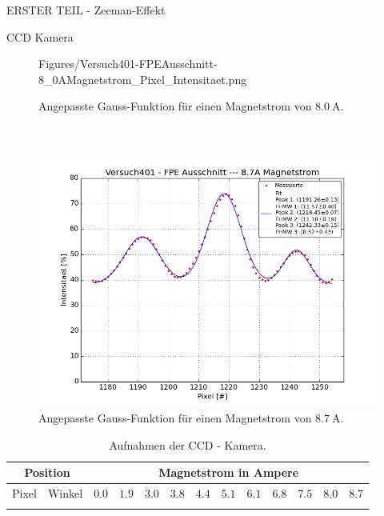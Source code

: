 \begin{appendix}
\begin{chapter}{ERSTER TEIL - Zeeman-Effekt}
\begin{section}{CCD Kamera}
\begin{figure}[htbp!]
\begin{minipage}{0.48\textwidth}
        {Figures/Versuch401-FPEAusschnitt-8_0AMagnetstrom_Pixel_Intensitaet.png}
          \caption{Angepasste Gauss-Funktion für einen Magnetstrom von 
              $\SI{8.0}{\ampere}$.}
          \label{fig:AnhangZM80}
        \end{minipage} \\
        \begin{minipage}{0.48\textwidth}
          \centering
          \includegraphics[width=\textwidth]
        {Figures/Versuch401-FPEAusschnitt-8_7AMagnetstrom_Pixel_Intensitaet.png}
          \caption{Angepasste Gauss-Funktion für einen Magnetstrom von 
              $\SI{8.7}{\ampere}$.}
          \label{fig:AnhangZM87}
        \end{minipage}
      \end{figure}
      
      \begin{scriptsize}
        \begin{longtable}[htbp]{|c|c|c|c|c|c|c|c|c|c|c|c|c|}
          \hline
          \multicolumn{2}{|c|}{Position} & \multicolumn{11}{|c|}{Magnetstrom 
              in Ampere}\\ \hline
          Pixel & Winkel & $0.0$ & $1.9$ & $3.0$ & $3.8$ & $4.4$ & $5.1$ & 
              $6.1$ & $6.8$ & $7.5$ & $8.0$ & $8.7$ \\ \hline\hline \endhead
          
          \caption{Aufnahmen der CCD - Kamera.}
          \label{tab:CCD}
        \end{longtable}
      \end{scriptsize}
      

\end{section}
\end{chapter}
\end{appendix}
